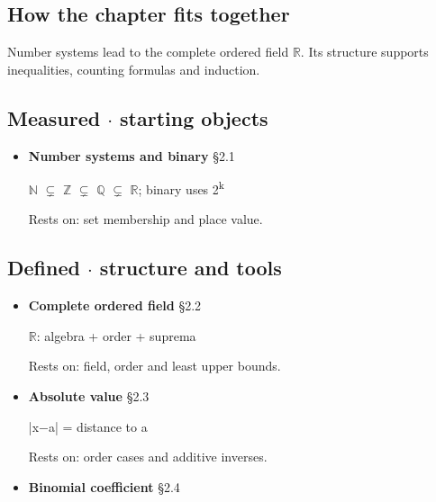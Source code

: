 \documentclass[11pt]{article}
\begin{document}
\begin{keepsection}
\section{How the chapter fits together}

Number systems lead to the complete ordered field \ensuremath{\mathbb{R}}. Its structure supports inequalities, counting formulas and induction.

\subsection{Measured \ensuremath{\cdot} starting objects}

\begin{itemize}
\item {}
\textbf{Number systems and binary} \hfill{\small\color{FAUblue}§2.1}

\ensuremath{\mathbb{N}} \ensuremath{\subsetneq} \ensuremath{\mathbb{Z}} \ensuremath{\subsetneq} \ensuremath{\mathbb{Q}} \ensuremath{\subsetneq} \ensuremath{\mathbb{R}}; binary uses 2\textsuperscript{k}

Rests on: set membership and place value.
\end{itemize}

\subsection{Defined \ensuremath{\cdot} structure and tools}

\begin{itemize}
\item {}
\textbf{Complete ordered field} \hfill{\small\color{FAUblue}§2.2}

\ensuremath{\mathbb{R}}: algebra + order + suprema

Rests on: field, order and least upper bounds.
\item {}
\textbf{Absolute value} \hfill{\small\color{FAUblue}§2.3}

|x\ensuremath{-}a| = distance to a

Rests on: order cases and additive inverses.
\item {}
\textbf{Binomial coefficient} \hfill{\small\color{FAUblue}§2.4}


\end{itemize}
\end{keepsection}
\end{document}
